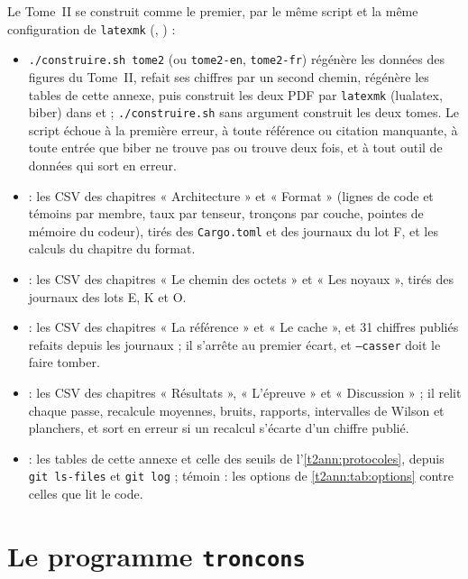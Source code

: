 Le Tome~II se construit comme le premier, par le même script et la même configuration de \texttt{latexmk} (, ) :
\begin{itemize}
\item \texttt{./construire.sh tome2} (ou \texttt{tome2-en}, \texttt{tome2-fr}) régénère les données des figures du Tome~II, refait ses chiffres par un second chemin, régénère les tables de cette annexe, puis construit les deux PDF par \texttt{latexmk} (lualatex, biber) dans  et  ; \texttt{./construire.sh} sans argument construit les deux tomes. Le script échoue à la première erreur, à toute référence ou citation manquante, à toute entrée que biber ne trouve pas ou trouve deux fois, et à tout outil de données qui sort en erreur.
\item {} : les CSV des chapitres « Architecture » et « Format » (lignes de code et témoins par membre, taux par tenseur, tronçons par couche, pointes de mémoire du codeur), tirés des \texttt{Cargo.toml} et des journaux du lot F, et les calculs du chapitre du format.
\item {} : les CSV des chapitres « Le chemin des octets » et « Les noyaux », tirés des journaux des lots E, K et O.
\item {} : les CSV des chapitres « La référence » et « Le cache », et 31 chiffres publiés refaits depuis les journaux ; il s'arrête au premier écart, et \texttt{--casser} doit le faire tomber.
\item {} : les CSV des chapitres « Résultats », « L'épreuve » et « Discussion » ; il relit chaque passe, recalcule moyennes, bruits, rapports, intervalles de Wilson et planchers, et sort en erreur si un recalcul s'écarte d'un chiffre publié.
\item {} : les tables de cette annexe et celle des seuils de l'\cref{t2ann:protocoles}, depuis \texttt{git ls-files} et \texttt{git log} ; témoin : les options de \cref{t2ann:tab:options} contre celles que lit le code.
\end{itemize}

\section{Le programme \texttt{troncons}}\label{t2ann:sec:programme}

